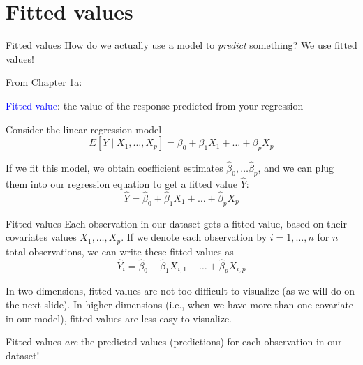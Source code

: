 \documentclass[10pt,t]{beamer}
\begin{document}
\section{Fitted values}

\begin{frame}{Fitted values}
How do we actually use a model to \textit{predict} something? We use fitted values!

\vspace{0.3cm}

From Chapter 1a:

\vspace{0.3cm}

\textcolor{blue}{Fitted value}: the value of the response predicted from your regression \pause

\vspace{0.3cm}

Consider the linear regression model
$$
E[Y \mid X_1, \dots, X_p] = \beta_0 + \beta_1 X_1 + \dots + \beta_p X_p
$$

If we fit this model, we obtain coefficient estimates $\hat{\beta}_0, \dots \hat{\beta}_p$, and we can plug them into our regression equation to get a fitted value $\hat{Y}$:
$$
\hat{Y} = \hat{\beta}_0 + \hat{\beta}_1 X_1 + \dots + \hat{\beta}_p X_p
$$

\end{frame}

\begin{frame}{Fitted values}
Each observation in our dataset gets a fitted value, based on their covariates values $X_1, \dots, X_p$. If we denote each observation by $i = 1, \dots, n$ for $n$ total observations, we can write these fitted values as
$$
\hat{Y}_i = \hat{\beta}_0 + \hat{\beta}_1 X_{i, 1} + \dots + \hat{\beta}_p X_{i, p}
$$

In two dimensions, fitted values are not too difficult to visualize (as we will do on the next slide). In higher dimensions (i.e., when we have more than one covariate in our model), fitted values are less easy to visualize.

\vspace{0.3cm}

Fitted values \textit{are} the predicted values (predictions) for each observation in our dataset!

\end{frame}
\end{document}
